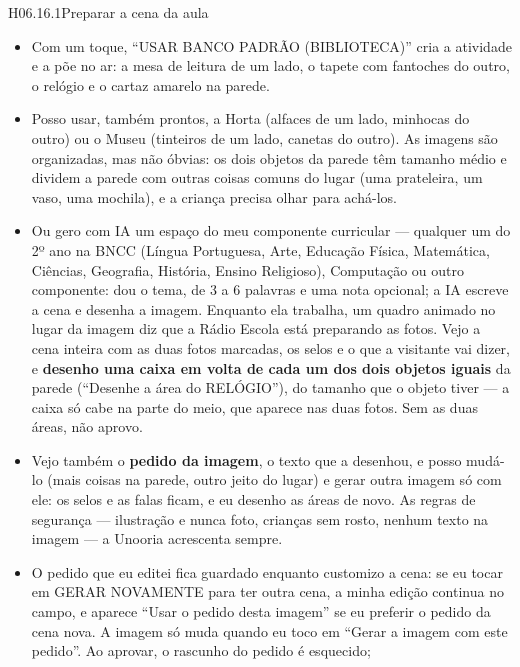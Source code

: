 \begin{historia}{H06.16.1}{Preparar a cena da aula}{\pronto}
\aceite
\begin{itemize}
  \item Com um toque, \enquote{USAR BANCO PADRÃO (BIBLIOTECA)} cria a
    atividade e a põe no ar: a mesa de leitura de um lado, o tapete com
    fantoches do outro, o relógio e o cartaz amarelo na parede.
  \item Posso usar, também prontos, a Horta (alfaces de um lado, minhocas do
    outro) ou o Museu (tinteiros de um lado, canetas do outro). As imagens são
    organizadas, mas não óbvias: os dois objetos da parede têm tamanho médio e
    dividem a parede com outras coisas comuns do lugar (uma prateleira, um
    vaso, uma mochila), e a criança precisa olhar para achá-los.
  \item Ou gero com IA um espaço do meu componente curricular --- qualquer um
    do 2º ano na BNCC (Língua Portuguesa, Arte, Educação Física, Matemática,
    Ciências, Geografia, História, Ensino Religioso), Computação ou outro
    componente: dou o tema, de 3 a 6 palavras e uma nota opcional; a IA
    escreve a cena e desenha a imagem. Enquanto ela trabalha, um quadro
    animado no lugar da imagem diz que a Rádio Escola está preparando as
    fotos. Vejo a cena inteira com as duas fotos marcadas, os selos e o que a
    visitante vai dizer, e \textbf{desenho uma caixa em volta de cada um dos
    dois objetos iguais} da parede (\enquote{Desenhe a área do RELÓGIO}),
    do tamanho que o objeto tiver --- a caixa só cabe na parte do meio, que
    aparece nas duas fotos. Sem as duas áreas, não aprovo.
  \item Vejo também o \textbf{pedido da imagem}, o texto que a desenhou, e
    posso mudá-lo (mais coisas na parede, outro jeito do lugar) e gerar outra
    imagem só com ele: os selos e as falas ficam, e eu desenho as áreas de
    novo. As regras de segurança --- ilustração e nunca foto, crianças sem
    rosto, nenhum texto na imagem --- a Unooria acrescenta sempre.
  \item O pedido que eu editei fica guardado enquanto customizo a cena: se
    eu tocar em GERAR NOVAMENTE para ter outra cena, a minha edição continua
    no campo, e aparece \enquote{Usar o pedido desta imagem} se eu preferir
    o pedido da cena nova. A imagem só muda quando eu toco em \enquote{Gerar
    a imagem com este pedido}. Ao aprovar, o rascunho do pedido é esquecido;

\end{itemize}
\end{historia}
